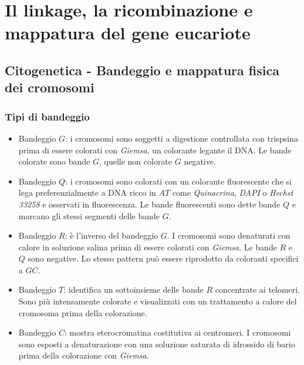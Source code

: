 \chapter{Il linkage, la ricombinazione e mappatura del gene eucariote}

\section{Citogenetica - Bandeggio e mappatura fisica dei cromosomi}

	\subsection{Tipi di bandeggio}
	\begin{multicols}{2}
		\begin{itemize}
			\item Bandeggio $G$: i cromosomi sono soggetti a digestione controllata con trispsina prima di essere colorati con \emph{Giemsa}, un colorante legante il DNA.
				Le bande colorate sono bande $G$, quelle non colorate $G$ negative.
			\item Bandeggio $Q$: i cromosomi sono colorati con un colorante fluorescente che si lega preferenzialmente a DNA ricco in $AT$ come \emph{Quinacrina}, \emph{DAPI} o \emph{Hechst 33258} e osservati in fluorescenza.
				Le bande fluorescenti sono dette bande $Q$ e marcano gli stessi segmenti delle bande $G$.
			\item Bandeggio $R$: \`e l'inverso del bandeggio $G$.
				I cromosomi sono denaturati con calore in soluzione salina prima di essere colorati con \emph{Giemsa}.
				Le bande $R$ e $Q$ sono negative.
				Lo stesso pattern pu\`o essere riprodotto da coloranti specifici a $GC$.
			\item Bandeggio $T$: identifica un sottoinsieme delle bande $R$ concentrate ai telomeri.
				Sono pi\`u intensamente colorate e visualizzati con un trattamento a calore del cromosoma prima della colorazione.
			\item Bandeggio $C$: mostra eterocromatina costitutiva ai centromeri.
				I cromosomi sono esposti a denaturazione con una soluzione saturata di idrossido di bario prima della colorazione con \emph{Giemsa}.
		\end{itemize}
	\end{multicols}

